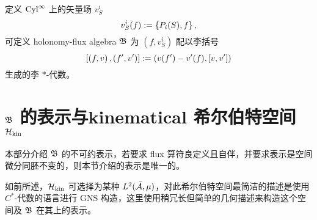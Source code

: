 
		定义 $\mathrm{Cyl}^\infty$ 上的矢量场 $v_S^i$
		\begin{equation}
			v_S^i(f) := \left\{ P_i(S), f \right\},
		\end{equation}
		可定义 holonomy-flux algebra $\mathfrak{B}$ 为 $(f,v_S^i)$ 配以李括号
		\begin{equation*}
			\left[ \left( f, v \right), \left( f', v' \right) \right] := \left( v(f') - v'(f), \left[ v, v' \right] \right)
		\end{equation*}
		生成的李 $*$-代数。


	\section{\texorpdfstring{$\mathfrak{B}$ 的表示与kinematical 希尔伯特空间 $\mathcal{H}_{\text{kin}}$}{B 的表示与 kinematical 希尔伯特空间}}

		本部分介绍 $\mathfrak{B}$ 的不可约表示，若要求 flux 算符良定义且自伴，并要求表示是空间微分同胚不变的，则本节介绍的表示是唯一的。\cite{Thiemann2007}

		如前所述，$\mathcal{H}_{\text{kin}}$ 可选择为某种 $L^2(\bar{\mathcal{A}},\mu)$，对此希尔伯特空间最简洁的描述是使用 $C^*$-代数的语言进行 GNS 构造\cite{Thiemann2007,Han2005}，这里使用稍冗长但简单的几何描述来构造这个空间及 $\mathfrak{B}$ 在其上的表示。


